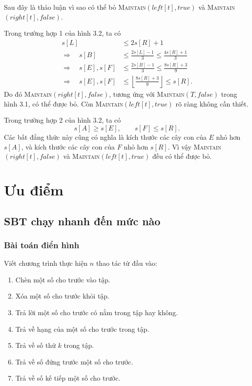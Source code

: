 \documentclass[11pt]{article}
\begin{document}
Sau đây là thảo luận vì sao có thể bỏ
\textsc{Maintain}$(\mathit{left}[t],\textit{true})$ và
\textsc{Maintain}$(\mathit{right}[t],\textit{false})$.

Trong trường hợp 1 của hình 3.2, ta có
\[
\begin{aligned}
s[L]&\le 2s[R]+1\\
\Rightarrow\quad
s[B]&\le \frac{2s[L]-1}{3}\le \frac{4s[R]+1}{3}\\
\Rightarrow\quad
s[E],s[F]&\le \frac{2s[B]-1}{3}\le \frac{8s[R]+3}{9}\\
\Rightarrow\quad
s[E],s[F]&\le
\left\lfloor\frac{8s[R]+3}{9}\right\rfloor\le s[R].
\end{aligned}
\]
Do đó \textsc{Maintain}$(\mathit{right}[t],\textit{false})$, tương ứng với
\textsc{Maintain}$(T,\textit{false})$ trong hình 3.1, có thể được bỏ. Còn
\textsc{Maintain}$(\mathit{left}[t],\textit{true})$ rõ ràng không cần thiết.

Trong trường hợp 2 của hình 3.2, ta có
\[
  s[A]\ge s[E],
  \qquad
  s[F]\le s[R].
\]
Các bất đẳng thức này cũng có nghĩa là kích thước các cây con của $E$ nhỏ hơn
$s[A]$, và kích thước các cây con của $F$ nhỏ hơn $s[R]$. Vì vậy
\textsc{Maintain}$(\mathit{right}[t],\textit{false})$ và
\textsc{Maintain}$(\mathit{left}[t],\textit{true})$ đều có thể được bỏ.

\section{Ưu điểm}

\subsection{SBT chạy nhanh đến mức nào}

\subsubsection{Bài toán điển hình}

Viết chương trình thực hiện $n$ thao tác từ đầu vào:

\begin{enumerate}
  \item Chèn một số cho trước vào tập.
  \item Xóa một số cho trước khỏi tập.
  \item Trả lời một số cho trước có nằm trong tập hay không.
  \item Trả về hạng của một số cho trước trong tập.
  \item Trả về số thứ $k$ trong tập.
  \item Trả về số đứng trước một số cho trước.
  \item Trả về số kế tiếp một số cho trước.
\end{enumerate}
\end{document}
